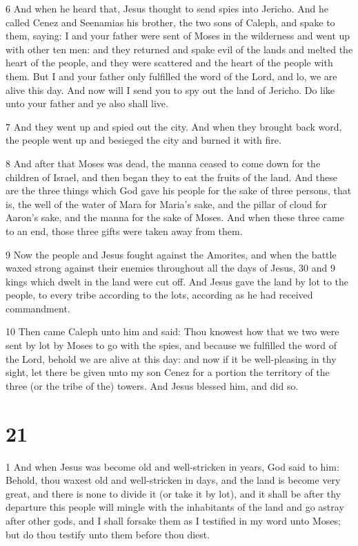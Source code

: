 \par 6 And when he heard that, Jesus thought to send spies into Jericho. And he called Cenez and Seenamias his brother, the two sons of Caleph, and spake to them, saying: I and your father were sent of Moses in the wilderness and went up with other ten men: and they returned and spake evil of the lands and melted the heart of the people, and they were scattered and the heart of the people with them. But I and your father only fulfilled the word of the Lord, and lo, we are alive this day. And now will I send you to spy out the land of Jericho. Do like unto your father and ye also shall live. 

\par 7 And they went up and spied out the city. And when they brought back word, the people went up and besieged the city and burned it with fire.

\par 8 And after that Moses was dead, the manna ceased to come down for the children of Israel, and then began they to eat the fruits of the land. And these are the three things which God gave his people for the sake of three persons, that is, the well of the water of Mara for Maria's sake, and the pillar of cloud for Aaron's sake, and the manna for the sake of Moses. And when these three came to an end, those three gifts were taken away from them. 

\par 9 Now the people and Jesus fought against the Amorites, and when the battle waxed strong against their enemies throughout all the days of Jesus, 30 and 9 kings which dwelt in the land were cut off. And Jesus gave the land by lot to the people, to every tribe according to the lots, according as he had received commandment. 

\par 10 Then came Caleph unto him and said: Thou knowest how that we two were sent by lot by Moses to go with the spies, and because we fulfilled the word of the Lord, behold we are alive at this day: and now if it be well-pleasing in thy sight, let there be given unto my son Cenez for a portion the territory of the three (or the tribe of the) towers. And Jesus blessed him, and did so.

\chapter{21}

\par 1 And when Jesus was become old and well-stricken in years, God said to him: Behold, thou waxest old and well-stricken in days, and the land is become very great, and there is none to divide it (or take it by lot), and it shall be after thy departure this people will mingle with the inhabitants of the land and go astray after other gods, and I shall forsake them as I testified in my word unto Moses; but do thou testify unto them before thou diest. 


